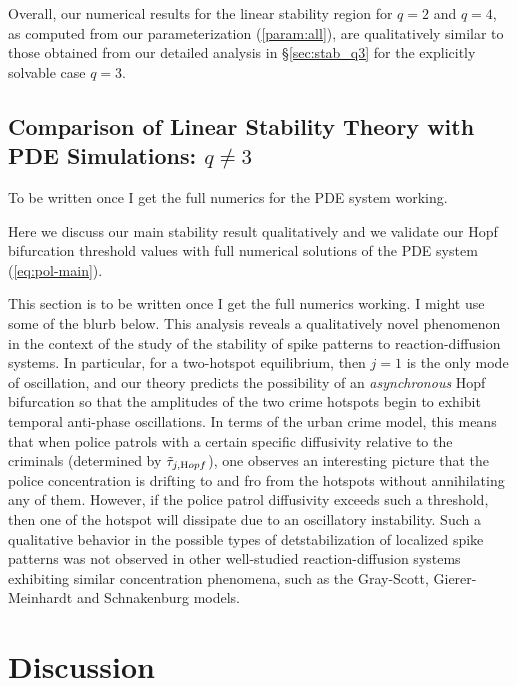 \documentclass{article}%
\newcommand{\highblue}[1]{{\color{blue}#1}}
\begin{document}
Overall, our numerical results for the linear stability region for
$q=2$ and $q=4$, as computed from our parameterization
(\ref{param:all}), are qualitatively similar to those obtained from our
detailed analysis in \S \ref{sec:stab_q3} for the explicitly solvable
case $q=3$.

\subsection{Comparison of Linear Stability Theory with PDE Simulations: 
$q\neq 3$}\label{sec:numerics_qn3}

\highblue{To be written once I get the full numerics for the PDE system
working.}

%


Here we discuss our main stability result qualitatively and we validate
our Hopf bifurcation threshold values with full numerical solutions of
the PDE system (\ref{eq:pol-main}).

\highblue{This section is to be written once I get the full numerics working.
I might use some of the blurb below.
This analysis reveals a qualitatively novel phenomenon in the context
of the study of the stability of spike patterns to reaction-diffusion
systems.  In particular, for a two-hotspot equilibrium, then $j=1$ is
the only mode of oscillation, and our theory predicts the possibility
of an \emph{asynchronous} Hopf bifurcation so that the amplitudes of
the two crime hotspots begin to exhibit temporal anti-phase
oscillations. In terms of the urban crime model, this means that when
police patrols with a certain specific diffusivity relative to the
criminals (determined by $\tilde{\tau}_{j,{\textrm Hopf}}$), one
observes an interesting picture that the police concentration is
drifting to and fro from the hotspots without annihilating any of
them. However, if the police patrol diffusivity exceeds such a
threshold, then one of the hotspot will dissipate due to an
oscillatory instability.  Such a qualitative behavior in the possible
types of detstabilization of localized spike patterns was not observed
in other well-studied reaction-diffusion systems exhibiting similar
concentration phenomena, such as the Gray-Scott, Gierer-Meinhardt and
Schnakenburg models.}




\setcounter{equation}{0}
\setcounter{section}{7}
\section{Discussion}
\end{document}
